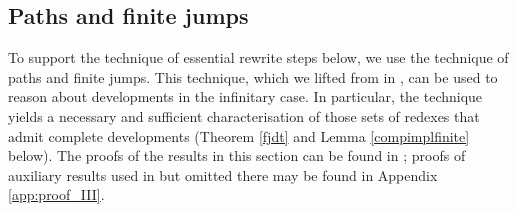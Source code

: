 \documentclass{LMCS}
\theoremstyle{definition}
\begin{document}
\subsection{Paths and finite jumps}
\label{sec:pathsjumps}

To support the technique of essential rewrite steps below, we use the technique of paths and finite jumps. This technique, which we lifted from \cite{T03_KV} in \cite{JJ05a}, can be used to reason about developments in the infinitary case. In particular, the technique yields a necessary and sufficient characterisation of those sets of redexes that admit complete developments (Theorem \ref{fjdt} and Lemma \ref{compimplfinite} below). The proofs of the results in this section can be found in \cite{JJ05a}; proofs of auxiliary results used in \cite{JJ05a} but omitted there may be found in Appendix \ref{app:proof_III}.
\end{document}
